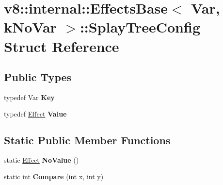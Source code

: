 \hypertarget{structv8_1_1internal_1_1_effects_base_1_1_splay_tree_config}{}\section{v8\+:\+:internal\+:\+:Effects\+Base$<$ Var, k\+No\+Var $>$\+:\+:Splay\+Tree\+Config Struct Reference}
\label{structv8_1_1internal_1_1_effects_base_1_1_splay_tree_config}
\subsection*{Public Types}
\begin{DoxyCompactItemize}
\item 
\hypertarget{structv8_1_1internal_1_1_effects_base_1_1_splay_tree_config_a9af7d9d843c8668b00eff3c0863bf6b0}{}typedef Var {\bfseries Key}\label{structv8_1_1internal_1_1_effects_base_1_1_splay_tree_config_a9af7d9d843c8668b00eff3c0863bf6b0}

\item 
\hypertarget{structv8_1_1internal_1_1_effects_base_1_1_splay_tree_config_a787e06f43d5b4d054387fb7023f41f59}{}typedef \hyperlink{structv8_1_1internal_1_1_effect}{Effect} {\bfseries Value}\label{structv8_1_1internal_1_1_effects_base_1_1_splay_tree_config_a787e06f43d5b4d054387fb7023f41f59}

\end{DoxyCompactItemize}
\subsection*{Static Public Member Functions}
\begin{DoxyCompactItemize}
\item 
\hypertarget{structv8_1_1internal_1_1_effects_base_1_1_splay_tree_config_af332490adbbf3cc4863fe2169a5be737}{}static \hyperlink{structv8_1_1internal_1_1_effect}{Effect} {\bfseries No\+Value} ()\label{structv8_1_1internal_1_1_effects_base_1_1_splay_tree_config_af332490adbbf3cc4863fe2169a5be737}

\item 
\hypertarget{structv8_1_1internal_1_1_effects_base_1_1_splay_tree_config_adb6d0e340408959906188d447ae92a1d}{}static int {\bfseries Compare} (int x, int y)\label{structv8_1_1internal_1_1_effects_base_1_1_splay_tree_config_adb6d0e340408959906188d447ae92a1d}

\end{DoxyCompactItemize}
